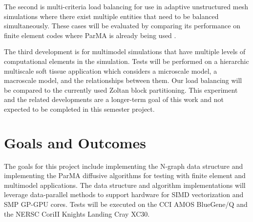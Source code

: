 \documentclass[a4paper]{article}
\begin{document}
The second is multi-criteria load balancing
for use in adaptive unstructured mesh simulations where there exist multiple
entities that need to be balanced simultaneously. These 
cases will be evaluated by comparing its performance on finite
element codes where ParMA is already being used \cite{phastaParma2015}.

The third development is for multimodel simulations that have
multiple levels of computational elements in the simulation. 
Tests will be performed on a hierarchic multiscale soft
tissue \cite{luo07} application which considers a
microscale model, a macroscale model, and the relationships
between them. Our load balancing will be compared to the
currently used Zoltan block partitioning. 
This experiment and the related developments are a longer-term goal of this work and not expected to be completed in this semester project.

\section{Goals and Outcomes}
The goals for this project include implementing the
N-graph data structure \cite{EnGPar2015proposal} and implementing the ParMA diffusive algorithms for testing with finite element and multimodel applications.
The data structure and algorithm implementations will leverage data-parallel methods to support hardware for SIMD vectorization and SMP GP-GPU cores.  Tests will be executed on the CCI AMOS BlueGene/Q and the NERSC CoriII Knights Landing Cray XC30.



\newpage 

%
\end{document}

